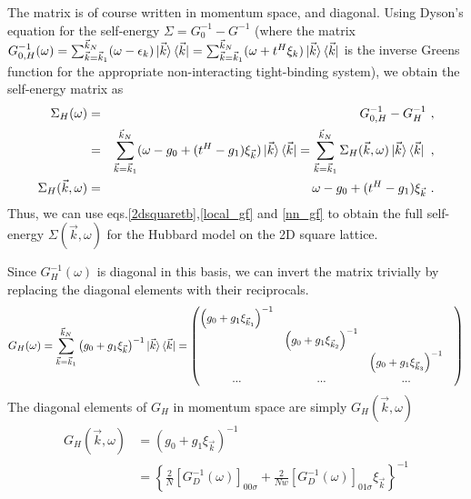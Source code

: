\documentclass[12pt]{article}
\numberwithin{equation}{section}
\begin{document}
The matrix is of course written in momentum space, and diagonal. Using Dyson's equation for the self-energy $\Sigma = G_{0}^{-1} - G^{-1}$ (where the matrix $G_{0,H}^{-1} (\omega) = \sum_{\vec k=\vec k_1}^{\vec k_N} (\omega -\epsilon_{k})\ket{\vec k}\bra{\vec k}=\sum_{\vec k=\vec k_1}^{\vec k_N} (\omega +t^{H}\xi_{k})\ket{\vec k}\bra{\vec k} $ is the inverse Greens function for the appropriate non-interacting tight-binding system), we obtain the self-energy matrix as
\begin{eqnarray}
\Sigma_{H} (\omega) &=& G_{0,H}^{-1} - G_{H}^{-1}~,\nonumber\\
&=&\sum_{\vec k=\vec k_1}^{\vec k_N} (\omega - g_{0} + (t^{H} - g_{1})\xi_{\vec{k}})\ket{\vec k}\bra{\vec k} = \sum_{\vec k=\vec k_1}^{\vec k_N} \Sigma_{H} (\vec{k},\omega) \ket{\vec k}\bra{\vec k}~,\nonumber\\
\Sigma_{H} (\vec{k},\omega) &=& \omega - g_{0} + (t^{H} - g_{1})\xi_{\vec{k}}~.
\end{eqnarray}
Thus, we can use eqs.\eqref{2dsquaretb},\eqref{local_gf} and \eqref{nn_gf} to obtain the full self-energy $\Sigma (\vec{k},\omega)$ for the Hubbard model on the 2D square lattice.
\par\noindent
Since $G_H^{-1}(\omega)$ is diagonal in this basis, we can invert the matrix trivially by replacing the diagonal elements with their reciprocals.
\begin{equation}\begin{aligned}
	G_H(\omega) = \sum_{\vec k=\vec k_1}^{\vec k_N}\left(g_0 + g_1 \xi_{\vec k}\right)^{-1}\ket{\vec k}\bra{\vec k} = \begin{pmatrix} \left(g_0 + g_1\xi_{\vec k_1}\right)^{-1} &&& \\
	& \left(g_0 + g_1\xi_{\vec k_2}\right)^{-1} && \\
	&& \left(g_0 + g_1\xi_{\vec k_3}\right)^{-1} & \\
	...&...&...&\\
	\end{pmatrix} 
\end{aligned}\end{equation}
The diagonal elements of $G_H$ in momentum space are simply $G_H(\vec k, \omega)$
\begin{equation}\begin{aligned}
	G_H(\vec k, \omega) &= \left(g_0 + g_1 \xi_{\vec k}\right)^{-1}\\
			    &= \left\{\frac{2}{N}\left[G_{D}^{-1}(\omega)\right]_{00\sigma} + \frac{2}{Nw}\left[G_{D}^{-1}(\omega)\right]_{01\sigma}\xi_{\vec k}\right\}^{-1}
\end{aligned}\end{equation}
\end{document}
